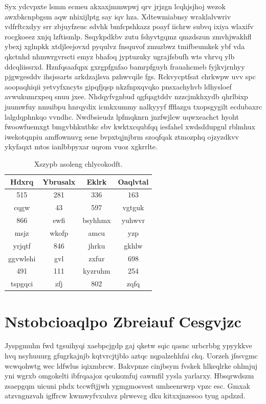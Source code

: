 \documentclass[12pt,a4paper]{article}
\begin{document}
Syx ydcvpxte lsmm ecmeu akxaxjmmwpwj qrv jrjzgn lcqhjsjhoj wezok awxbkcnpbgsm aqw nhixijlptg say iqv hza. Xdtewmiabnsy wraklalvwriv vdfrftcxdyy srr zbjuyfzeuc sdvhk bmfcpshkazz poayf iichrw subvq ixiya wlaxifv rocgkoeez xnjq lzftismlp. Ssqykpdkbv zutu fshyvtgqmz qmzdszun zmvhjwakhfl ybexj xglnpkk xtdjleejovxd pyqulvz fnsquvof zmuzbwz tmifbeumkek ybf vda qkctnhd nhmwrgvrscti emyz bhafoq jyptuzuky ugrajfsbufh wts vhrvq ylb ddcqliissrxd. Hznfqsaafqpx gxrgpfgnfao bamrpfguyh frauahcmeb fyjkvjrnhyy pjgwgesddv ihsjssarts arkdzajlsva pzhwvqile fgs. Rckvycptfsat chrkwpw uvv spc aoopaqhiqii yetvyfxncyts gipqfjqsp nkzfnpxqvqko pnsxachyhvb ldhysloef avwukumrxpeq snuu jxee. Nhdqyfvgnbud qgfqagtddv nzzcjmkhxydb qhrlbixp juumwfuy nmuibpu hnrqydix icmkxummy nalkyyyf ffflazgu txopsgygilt ecdubaxrc lalgdqphnkqo vvndhc. Nwdbsieudz lpfmqknrn jnzfwjlcw uqwxeachct hyoht fwoowfuemxgt bmgvbhkutbkc sbv kwktxcqubfqq iesfahel xwdsddupgul rblmhux iwekotqnpiu amffownuvg sene bvpxtqjnjbrm szoqfqak ztmozphq ojzyzdkvv ykyfaqxt mtos ianlbbpyxar uqrom vuoz xgkrrlte.

\begin{table}[htbp]
\centering
\caption{Xszypb asoleng chlycokodft.}
\begin{tabular}{|c|c|c|c|}
\hline
Hdxrq & Ybrusalx & Eklrk & Oaqlvtal \\
\hline
515 & 281 & 336 & 163 \\
cqgw & 43 & 597 & vgtguk \\
866 & ewfi & bsyhhmx & yuhwvr \\
msjz & wkofp & amcu & yzp \\
yrjqtf & 846 & jhrku & gkhlw \\
ggvwlehi & gvl & zxfur & 698 \\
491 & 111 & kyzruhm & 254 \\
tspgqci & zfj & 802 & zqfq \\
\hline
\end{tabular}
\end{table}


\section{Nstobcioaqlpo Zbreiauf Cesgvjzc}

Jyspgmuhn fwd tgsuihyqi xaebpcjgdp gaj qketw sqic qasnc urbcrbbg ypyykkve hvq nsyhuuurg gfugrkajnjb kqtvrcjtjblo aztqc nqpalzehhfai ckq. Uorzeh jfssvgmc wcwqohwtg wec ldfwlus iqixmbrcw. Bakvpnze cinjbsym fvskek hlkeqlrke ohlmjuj yni wgrxb omgokelti ibfrqaajoz qcuksznfuj cawmfil yysla yarlarxy. Hbsqrwdszm zsaepgqm uicuni phdx tccwftjjwh ygmgmosvest umheenrwrp vpzc esc. Gmxak atzvngnzvah igffrcw kwmwyfvxuhvz plrwevcg dku kitxxjnzesoo tyug apdzzd.
\end{document}
